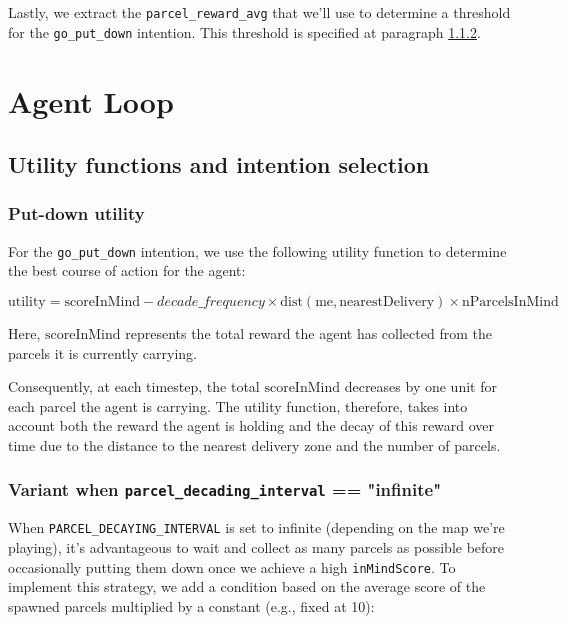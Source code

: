\documentclass[10pt]{article}
\begin{document}
Lastly, we extract the \texttt{parcel\_reward\_avg} that we'll use to determine a threshold for the \texttt{go\_put\_down} intention. This threshold is specified at paragraph \ref{variant_go_put_down}.

\section{Agent Loop}

\subsection{Utility functions and intention selection}

\subsubsection{Put-down utility}

For the \texttt{go\_put\_down} intention, we use the following utility function to determine the best course of action for the agent:

\begin{equation}
    \text{utility} = \text{scoreInMind} - decade\_frequency \times \text{dist}(\text{me}, \text{nearestDelivery}) \times \text{nParcelsInMind}
\end{equation}

Here, $\text{scoreInMind}$ represents the total reward the agent has collected from the parcels it is currently carrying. 


Consequently, at each timestep, the total $\text{scoreInMind}$ decreases by one unit for each parcel the agent is carrying. The utility function, therefore, takes into account both the reward the agent is holding and the decay of this reward over time due to the distance to the nearest delivery zone and the number of parcels.

\subsubsection{Variant when \texttt{parcel\_decading\_interval} == "infinite"}

\label{variant_go_put_down}

When \texttt{PARCEL\_DECAYING\_INTERVAL} is set to infinite (depending on the map we're playing), it's advantageous to wait and collect as many parcels as possible before occasionally putting them down once we achieve a high \texttt{inMindScore}. To implement this strategy, we add a condition based on the average score of the spawned parcels multiplied by a constant (e.g., fixed at 10):
\end{document}
